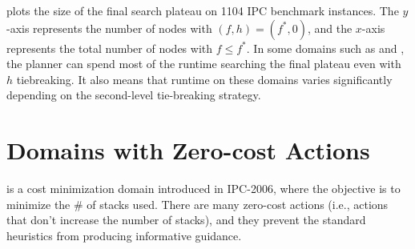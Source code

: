 
 plots the size of the final search plateau on 1104 IPC
benchmark instances.
The $y$-axis
represents the number of nodes with $(f,h)=(f^*,0)$, and the $x$-axis represents the total
number of nodes with $f\leq f^*$.
In some domains such as  and , the planner can spend most of the runtime
searching the final plateau even with $h$ tiebreaking.
It also
means that runtime on these domains varies significantly depending on the second-level tie-breaking strategy.




\section{Domains with Zero-cost Actions}
\label{sec:zerocost-domains}
  is a cost
minimization domain introduced in IPC-2006, where the objective is to 
minimize the \# of stacks used.
There are many zero-cost actions (i.e., actions that don't increase the number of stacks), and
they prevent the standard heuristics from producing
informative guidance.




